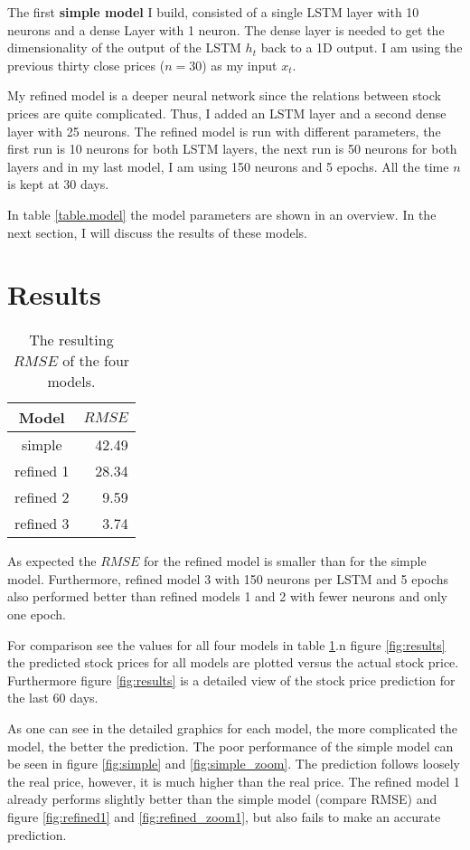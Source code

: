 \documentclass[fleqn,10pt]{SelfArx} %
\begin{document}
The first \textbf{simple model} I build, consisted of a single LSTM layer with 10 neurons and a dense Layer with 1 neuron. The dense layer is needed to get the dimensionality of the output of the LSTM $h_t$ back to a 1D output. I am using the previous thirty close prices ($n=30$) as my input $x_t$.

My refined model is a deeper neural network since the relations between stock prices are quite complicated. Thus, I added an LSTM layer and a second dense layer with 25 neurons. The refined model is run with different parameters, the first run is 10 neurons for both LSTM layers, the next run is 50 neurons for both layers and in my last model, I am using 150 neurons and 5 epochs. All the time $n$ is kept at $30$ days.

In table \ref{table.model} the model parameters are shown in an overview. In the next section, I will discuss the results of these models.


\section{Results}

\begin{table}[H]
	\caption{The resulting $RMSE$ of the four models.}
	\centering
	\begin{tabular}{cr}
	\hline 
	Model & $RMSE$ \\ 
	\hline 
	simple & 42.49 \\ 
	refined 1 & 28.34 \\ 
	refined 2 & 9.59 \\ 
	refined 3 & 3.74 \\ 
	\hline 
	\end{tabular} 
	\label{tab:rsme}
\end{table}

As expected the $RMSE$ for the refined model is smaller than for the simple model. Furthermore, refined model 3 with 150 neurons per LSTM and 5 epochs also performed better than refined models 1 and 2 with fewer neurons and only one epoch. 

For comparison see the values for all four models in table \ref{tab:rsme}.n figure \ref{fig:results} the predicted stock prices for all models are plotted versus the actual stock price. Furthermore figure \ref{fig:results} is a detailed view of the stock price prediction for the last 60 days. 

As one can see in the detailed graphics for each model, the more complicated the model, the better the prediction. The poor performance of the simple model can be seen in figure \ref{fig:simple} and \ref{fig:simple_zoom}. The prediction follows loosely the real price, however, it is much higher than the real price.  The refined model 1 already performs slightly better than the simple model (compare RMSE) and figure \ref{fig:refined1} and \ref{fig:refined_zoom1}, but also fails to make an accurate prediction.
\end{document}
